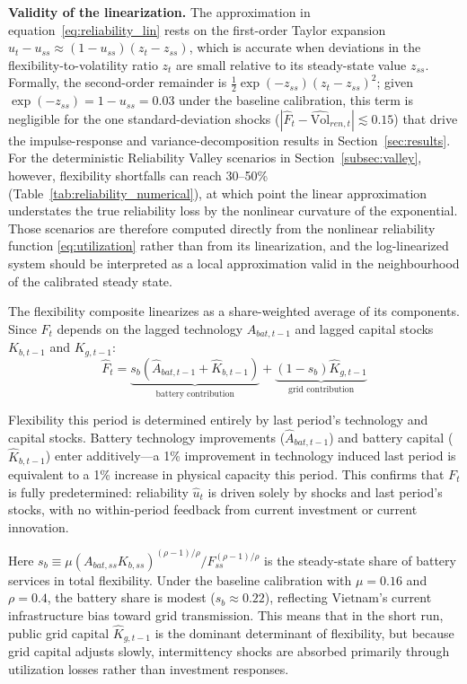 \documentclass[12pt, a4paper]{article}
\begin{document}
\noindent \textbf{Validity of the linearization.} The approximation in equation~\eqref{eq:reliability_lin} rests on the first-order Taylor expansion $u_t - u_{ss} \approx (1-u_{ss})(z_t - z_{ss})$, which is accurate when deviations in the flexibility-to-volatility ratio $z_t$ are small relative to its steady-state value $z_{ss}$. Formally, the second-order remainder is $\frac{1}{2}\exp(-z_{ss})(z_t - z_{ss})^2$; given $\exp(-z_{ss}) = 1 - u_{ss} = 0.03$ under the baseline calibration, this term is negligible for the one standard-deviation shocks ($|\hat{F}_t - \hat{\text{Vol}}_{ren,t}| \lesssim 0.15$) that drive the impulse-response and variance-decomposition results in Section~\ref{sec:results}. For the deterministic Reliability Valley scenarios in Section~\ref{subsec:valley}, however, flexibility shortfalls can reach 30--50\% (Table~\ref{tab:reliability_numerical}), at which point the linear approximation understates the true reliability loss by the nonlinear curvature of the exponential. Those scenarios are therefore computed directly from the nonlinear reliability function \eqref{eq:utilization} rather than from its linearization, and the log-linearized system should be interpreted as a local approximation valid in the neighbourhood of the calibrated steady state.

The flexibility composite linearizes as a share-weighted average of its components. Since $F_t$ depends on the lagged technology $A_{bat,t-1}$ and lagged capital stocks $K_{b,t-1}$ and $K_{g,t-1}$:
\begin{equation}
\hat{F}_t = \underbrace{s_b \left(\hat{A}_{bat,t-1} + \hat{K}_{b,t-1}\right)}_{\text{battery contribution}} + \underbrace{(1 - s_b) \hat{K}_{g,t-1}}_{\text{grid contribution}}
\label{eq:flex_lin}
\end{equation}

Flexibility this period is determined entirely by last period's technology and capital stocks. Battery technology improvements ($\hat{A}_{bat,t-1}$) and battery capital ($\hat{K}_{b,t-1}$) enter additively---a 1\% improvement in technology induced last period is equivalent to a 1\% increase in physical capacity this period. This confirms that $F_t$ is fully predetermined: reliability $\hat{u}_t$ is driven solely by shocks and last period's stocks, with no within-period feedback from current investment or current innovation.

Here $s_b \equiv \mu (A_{bat,ss} K_{b,ss})^{(\rho-1)/\rho} / F_{ss}^{(\rho-1)/\rho}$ is the steady-state share of battery services in total flexibility. Under the baseline calibration with $\mu = 0.16$ and $\rho = 0.4$, the battery share is modest ($s_b \approx 0.22$), reflecting Vietnam's current infrastructure bias toward grid transmission. This means that in the short run, public grid capital $\hat{K}_{g,t-1}$ is the dominant determinant of flexibility, but because grid capital adjusts slowly, intermittency shocks are absorbed primarily through utilization losses rather than investment responses.
\end{document}
